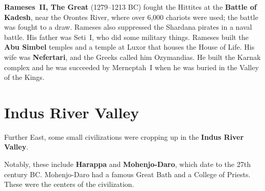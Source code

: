 \textbf{Rameses~II, The Great} (1279--1213 BC) fought the Hittites at the \textbf{Battle of Kadesh},
near the Orontes River, where over 6,000 chariots were used;
the battle was fought to a draw.
Rameses also suppressed the Shardana pirates in a naval battle.
His father was Seti~I, who did some military things.
Rameses built the \textbf{Abu Simbel} temples and a temple at Luxor that houses the House of Life.
His wife was \textbf{Nefertari}, and the Greeks called him Ozymandias.
He built the Karnak complex and he was succeeded by Merneptah~I when he was buried in the Valley of the Kings.

\section{Indus River Valley}

Further East, some small civilizations were cropping up in the \textbf{Indus River Valley}.

Notably, these include \textbf{Harappa} and \textbf{Mohenjo-Daro}, which date to the 27th century BC\@.
Mohenjo-Daro had a famous Great Bath and a College of Priests.
These were the centers of the civilization.
